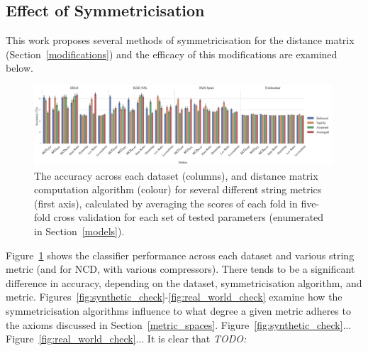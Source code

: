 \documentclass[preprint,12pt]{article}
\newcommand{\cm}[1]{\textit{{\color{blue}#1}}}
\begin{document}
\subsection{Effect of Symmetricisation}

This work proposes several methods of symmetricisation for the distance matrix (Section~\ref{modifications}) and the efficacy of this modifications are examined below. 

\begin{figure}[p]
    \centering
    \includegraphics[width=0.99\textwidth]{images/accuracy_vs_symmetry.pdf}
    \caption{The accuracy across each dataset (columns),  and distance matrix computation algorithm (colour) for several different string metrics (first axis), calculated by averaging the scores of each fold in five-fold cross validation for each set of tested parameters (enumerated in Section~\ref{models}).}
    \label{fig:symmetric_acc}
\end{figure}
Figure~\ref{fig:symmetric_acc} shows the classifier performance across each dataset and various string metric (and for NCD, with various compressors).
There tends to be a significant difference in accuracy, depending on the dataset, symmetricisation algorithm, and metric. 
Figures~\ref{fig:synthetic_check}-\ref{fig:real_world_check} examine how the symmetricisation algorithms influence to what degree a given metric adheres to the axioms discussed in Section~\ref{metric_spaces}.  
Figure~\ref{fig:synthetic_check}...
Figure~\ref{fig:real_world_check}...
It is clear that \cm{TODO:}
\end{document}
